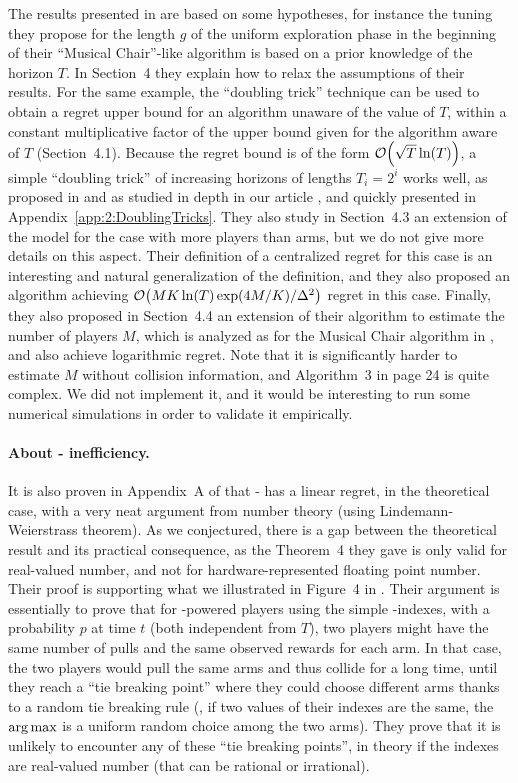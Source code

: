 The results presented in \cite{LugosiMehrabian18} are based on some hypotheses, for instance the tuning they propose for the length $g$ of the uniform exploration phase in the beginning of their ``Musical Chair''-like algorithm is based on a prior knowledge of the horizon $T$.
In Section~4 they explain how to relax the assumptions of their results.
For the same example, the ``doubling trick'' technique can be used to obtain a regret upper bound for an algorithm unaware of the value of $T$, within a constant multiplicative factor of the upper bound given for the algorithm aware of $T$ (Section~4.1). Because the regret bound is of the form $\mathop{}\mathopen{}\mathcal{O}\mathopen{}\left(\sqrt{T} \ln(T)\right)$, a simple ``doubling trick'' of increasing horizons of lengths $T_i = 2^i$ works well, as proposed in \cite{CesaLugosi06} and as studied in depth in our article \cite{Besson2018DoublingTricks}, and quickly presented in Appendix~\ref{app:2:DoublingTricks}.
%
They also study in Section~4.3 an extension of the model for the case with more players than arms, but we do not give more details on this aspect. Their definition of a centralized regret for this case is an interesting and natural generalization of the definition, and they also proposed an algorithm achieving $\mathop{}\mathopen{}\mathcal{O}\mathopen{}\left(M K \ln(T) \exp(4M/K) / \Delta^2\right)$ regret in this case.
Finally, they also proposed in Section~4.4 an extension of their algorithm to estimate the number of players $M$, which is analyzed as for the Musical Chair algorithm in \cite{Rosenski16}, and also achieve logarithmic regret.
Note that it is significantly harder to estimate $M$ without collision information, and Algorithm~3 in page 24 is quite complex.
We did not implement it, and it would be interesting to run some numerical simulations in order to validate it empirically.


\paragraph{About \Selfish-\UCB{} inefficiency.}
%
It is also proven in Appendix~A of \cite{BoursierPerchet18} that \Selfish-\UCB{} has a linear regret, in the theoretical case, with a very neat argument from number theory (using Lindemann-Weierstrass theorem). As we conjectured, there is a gap between the theoretical result and its practical consequence, as the Theorem~4 they gave is only valid for real-valued number, and not for hardware-represented floating point number.
Their proof is supporting what we illustrated in Figure~4 in \cite{Besson2018ALT}.
Their argument is essentially to prove that for \Selfish-powered players using the simple \UCB-indexes, with a probability $p$ at time $t$ (both independent from $T$), two players might have the same number of pulls and the same observed rewards for each arm. In that case, the two players would pull the same arms and thus collide for a long time, until they reach a ``tie breaking point'' where they could choose different arms thanks to a random tie breaking rule (\eg, if two values of their \UCB{} indexes are the same, the $\operatorname*{arg\,max}$ is a uniform random choice among the two arms).
They prove that it is unlikely to encounter any of these ``tie breaking points'', in theory if the \UCB{} indexes are real-valued number (that can be rational or irrational).


